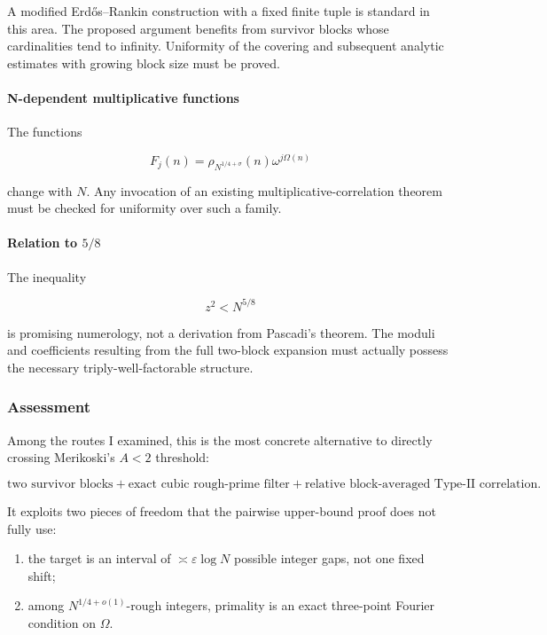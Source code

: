 A modified Erdős–Rankin construction with a fixed finite tuple is standard in this area. The proposed argument benefits from survivor blocks whose cardinalities tend to infinity. Uniformity of the covering and subsequent analytic estimates with growing block size must be proved.

\paragraph{N-dependent multiplicative functions}

The functions

\[
F_j(n)=\rho_{N^{1/4+\sigma}}(n)\omega^{j\Omega(n)}
\]

change with \(N\). Any invocation of an existing multiplicative-correlation theorem must be checked for uniformity over such a family.

\paragraph{Relation to \(5/8\)}

The inequality

\[
z^2<N^{5/8}
\]

is promising numerology, not a derivation from Pascadi’s theorem. The moduli and coefficients resulting from the full two-block expansion must actually possess the necessary triply-well-factorable structure.

\subsubsection*{Assessment}

Among the routes I examined, this is the most concrete alternative to directly crossing Merikoski’s \(A<2\) threshold:

\[
\boxed{
\text{two survivor blocks}
+
\text{exact cubic rough-prime filter}
+
\text{relative block-averaged Type-II correlation}.
}
\]

It exploits two pieces of freedom that the pairwise upper-bound proof does not fully use:

\begin{enumerate}
\item the target is an interval of \(\asymp\varepsilon\log N\) possible integer gaps, not one fixed shift;
\item among \(N^{1/4+o(1)}\)-rough integers, primality is an exact three-point Fourier condition on \(\Omega\).
\end{enumerate}


